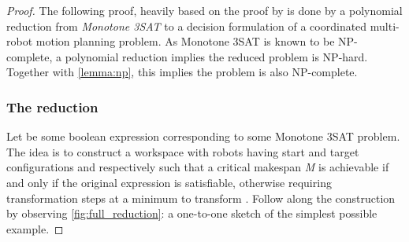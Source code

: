 \begin{proof}
	The following proof, heavily based on the proof by \cite{siamcomp/DemaineFKMS19} is done by a polynomial reduction from \emph{Monotone 3SAT} to a decision formulation of a coordinated multi-robot motion planning problem. As Monotone 3SAT is known to be NP-complete, a polynomial reduction implies the reduced problem is NP-hard. Together with \cref{lemma:np}, this implies the problem is also NP-complete. 






	\subsubsection*{The reduction} 
	Let \ilmath{\varphi} be some boolean expression corresponding to some Monotone 3SAT problem. The idea is to construct a workspace with robots having start and target configurations  and  respectively such that a critical makespan \emph{M} is achievable if and only if the original expression \ilmath{\varphi} is satisfiable, otherwise requiring  transformation steps at a minimum to transform . Follow along the construction by observing \cref{fig:full_reduction}: a one-to-one sketch of the simplest possible example. 






\end{proof}
